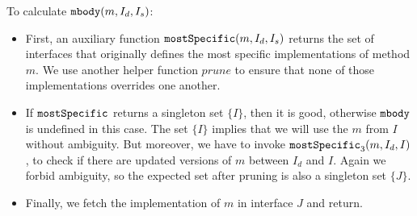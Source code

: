 To calculate $\texttt{mbody}(m, I_d, I_s)$:
\begin{itemize}
	\item First, an auxiliary function $\texttt{mostSpecific}(m, I_d, I_s)$ returns the set of interfaces that
	originally defines the most specific implementations of method $m$. We use another helper function $prune$ to ensure that none of those implementations overrides one another.
	\item If $\texttt{mostSpecific}$ returns a singleton set $\{I\}$, then it is good, otherwise $\texttt{mbody}$ is undefined in
	this case. The set $\{I\}$ implies that we will use the $m$ from $I$ without ambiguity. But moreover, we have to invoke $\texttt{mostSpecific}_3(m, I_d, I)$, to check if there are updated versions of $m$ between $I_d$ and $I$. Again we forbid ambiguity, so the expected set after pruning is also a singleton set $\{J\}$.
	\item Finally, we fetch the implementation of $m$ in interface $J$ and return.
\end{itemize}

\begin{comment}
$mbody(m, I)$ algorithm:
\begin{itemize}
	\item If m is defined in I directly, then return I.m()
	\item Else, let $\overline{I'} = mdefined(fathers(I))$, all ancestors of $I$ that has directly defined $m()$.
	\item $\overline{I''} = needed(\overline{I'})$, keep only interfaces that are needed, which are not super-interface of others.
	\item If $\overline{I''}$ is unique, then return this unique one. Else if any two I1,I2 in $\overline{I''}$ share a parent in $\overline{I'}$, then diamond conflict is detected, report error. Else return multiple $m()$s.
\end{itemize}
\end{comment}

\subsubsection{\mostSpecific}



\subsubsection{\mtype}


